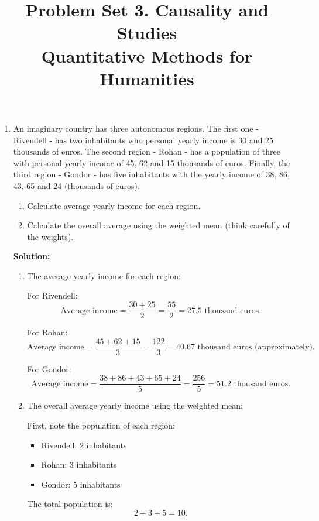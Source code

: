 \documentclass[12pt]{article}
\author{\empty}
\title{Problem Set 3. Causality and Studies \\ Quantitative Methods for Humanities}
\date{\empty}
\begin{document}
\maketitle
	
\begin{enumerate}
	
\item An imaginary country has three autonomous regions. The first one - Rivendell - has two inhabitants who personal yearly income is 30 and 25 thousands of euros. The second region - Rohan - has a population of three with personal yearly income of 45, 62 and 15 thousands of euros. Finally, the third region - Gondor - has five inhabitants with the yearly income of  38, 86, 43, 65 and 24 (thousands of euros).

 
\begin{enumerate}
\item Calculate average yearly income for each region.
\item  Calculate the overall average using the weighted mean (think carefully of the weights).
\end{enumerate}

{\color{blue}
\noindent \textbf{Solution:}

\begin{enumerate}
\item The average yearly income for each region:

For Rivendell:
\[
\text{Average income} = \frac{30 + 25}{2} = \frac{55}{2} = 27.5 \text{ thousand euros}.
\]

For Rohan:
\[
\text{Average income} = \frac{45 + 62 + 15}{3} = \frac{122}{3} = 40.67 \text{ thousand euros (approximately)}.
\]

For Gondor:
\[
\text{Average income} = \frac{38 + 86 + 43 + 65 + 24}{5} = \frac{256}{5} = 51.2 \text{ thousand euros}.
\]

\item The overall average yearly income using the weighted mean:

First, note the population of each region:
\begin{itemize}
    \item Rivendell: \(2\) inhabitants
    \item Rohan: \(3\) inhabitants
    \item Gondor: \(5\) inhabitants
\end{itemize}

The total population is:
\[
2 + 3 + 5 = 10.
\]


\end{enumerate}}
\end{enumerate}
\end{document}
